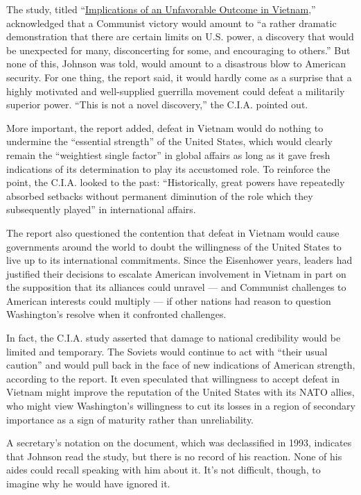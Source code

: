 The study, titled
``\href{https://www.cia.gov/library/readingroom/docs/DOC_0001166443.pdf}{Implications
of an Unfavorable Outcome in Vietnam},'' acknowledged that a Communist
victory would amount to ``a rather dramatic demonstration that there are
certain limits on U.S. power, a discovery that would be unexpected for
many, disconcerting for some, and encouraging to others.'' But none of
this, Johnson was told, would amount to a disastrous blow to American
security. For one thing, the report said, it would hardly come as a
surprise that a highly motivated and well-supplied guerrilla movement
could defeat a militarily superior power. ``This is not a novel
discovery,'' the C.I.A. pointed out.

More important, the report added, defeat in Vietnam would do nothing to
undermine the ``essential strength'' of the United States, which would
clearly remain the ``weightiest single factor'' in global affairs as
long as it gave fresh indications of its determination to play its
accustomed role. To reinforce the point, the C.I.A. looked to the past:
``Historically, great powers have repeatedly absorbed setbacks without
permanent diminution of the role which they subsequently played'' in
international affairs.

The report also questioned the contention that defeat in Vietnam would
cause governments around the world to doubt the willingness of the
United States to live up to its international commitments. Since the
Eisenhower years, leaders had justified their decisions to escalate
American involvement in Vietnam in part on the supposition that its
alliances could unravel --- and Communist challenges to American
interests could multiply --- if other nations had reason to question
Washington's resolve when it confronted challenges.

In fact, the C.I.A. study asserted that damage to national credibility
would be limited and temporary. The Soviets would continue to act with
``their usual caution'' and would pull back in the face of new
indications of American strength, according to the report. It even
speculated that willingness to accept defeat in Vietnam might improve
the reputation of the United States with its NATO allies, who might view
Washington's willingness to cut its losses in a region of secondary
importance as a sign of maturity rather than unreliability.

A secretary's notation on the document, which was declassified in 1993,
indicates that Johnson read the study, but there is no record of his
reaction. None of his aides could recall speaking with him about it.
It's not difficult, though, to imagine why he would have ignored it.

